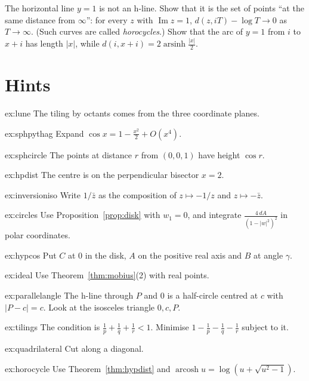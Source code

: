 \begin{exercise}[$\star\star\star$]\label{ex:horocycle}
The horizontal line $y=1$ is not an h-line. Show that it is the set of points ``at the same distance from $\infty$'': for every $z$ with $\operatorname{Im}z=1$,
$d(z,iT)-\log T\to0$ as $T\to\infty$. (Such curves are called \emph{horocycles}.) Show that the arc of $y=1$ from $i$ to $x+i$ has length $|x|$, while
$d(i,x+i)=2\operatorname{arsinh}\frac{|x|}2$.
\end{exercise}

\section{Hints}

\begin{hint}{ex:lune}
The tiling by octants comes from the three coordinate planes.
\end{hint}
\begin{hint}{ex:sphpythag}
Expand $\cos x=1-\frac{x^2}2+O(x^4)$.
\end{hint}
\begin{hint}{ex:sphcircle}
The points at distance $r$ from $(0,0,1)$ have height $\cos r$.
\end{hint}
\begin{hint}{ex:hpdist}
The centre is on the perpendicular bisector $x=2$.
\end{hint}
\begin{hint}{ex:inversioniso}
Write $1/\bar z$ as the composition of $z\mapsto-1/z$ and $z\mapsto-\bar z$.
\end{hint}
\begin{hint}{ex:circles}
Use Proposition~\ref{prop:disk} with $w_1=0$, and integrate $\frac{4\,dA}{(1-|w|^2)^2}$ in polar coordinates.
\end{hint}
\begin{hint}{ex:hypcos}
Put $C$ at $0$ in the disk, $A$ on the positive real axis and $B$ at angle $\gamma$.
\end{hint}
\begin{hint}{ex:ideal}
Use Theorem~\ref{thm:mobius}(2) with real points.
\end{hint}
\begin{hint}{ex:parallelangle}
The h-line through $P$ and $0$ is a half-circle centred at $c$ with $|P-c|=c$. Look at the isosceles triangle $0,c,P$.
\end{hint}
\begin{hint}{ex:tilings}
The condition is $\frac1p+\frac1q+\frac1r<1$. Minimise $1-\frac1p-\frac1q-\frac1r$ subject to it.
\end{hint}
\begin{hint}{ex:quadrilateral}
Cut along a diagonal.
\end{hint}
\begin{hint}{ex:horocycle}
Use Theorem~\ref{thm:hypdist} and $\operatorname{arcosh}u=\log(u+\sqrt{u^2-1})$.
\end{hint}

